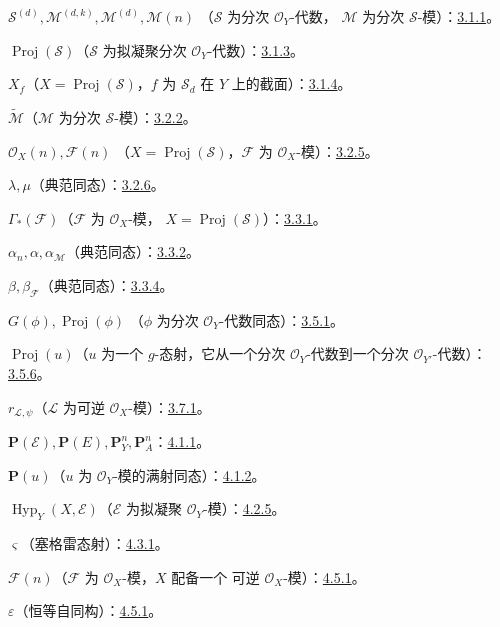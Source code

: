 \documentclass[UTF8,fontset=none,11pt,oneside,openany]{ctexbook}
\providecommand{\vphi}{\phi}
\providecommand{\Proj}{\operatorname{Proj}}
\providecommand{\Hyp}{\operatorname{Hyp}}
\newcommand{\oldpage}[2][]{%
  \hypertarget{ega-source-page-#1-#2}{}%
  \marginnote{\scriptsize\textbf{#1}~|~#2}\ignorespaces}
\begin{document}
$\mathcal{S}^{(d)},\mathcal{M}^{(d,k)},\mathcal{M}^{(d)},\mathcal{M}(n)$
（$\mathcal{S}$ 为分次 $\mathcal{O}_Y$-代数，
$\mathcal{M}$ 为分次 $\mathcal{S}$-模）：\hyperref[II.3.1.1-zh]{3.1.1}。

$\Proj(\mathcal{S})$（$\mathcal{S}$ 为拟凝聚分次 $\mathcal{O}_Y$-代数）：\hyperref[II.3.1.3-zh]{3.1.3}。

$X_f$（$X=\Proj(\mathcal{S})$，$f$ 为 $\mathcal{S}_d$ 在 $Y$ 上的截面）：\hyperref[II.3.1.4-zh]{3.1.4}。

$\widetilde{\mathcal{M}}$（$\mathcal{M}$ 为分次 $\mathcal{S}$-模）：\hyperref[II.3.2.2-zh]{3.2.2}。

$\mathcal{O}_X(n),\mathcal{F}(n)$
（$X=\Proj(\mathcal{S})$，$\mathcal{F}$ 为 $\mathcal{O}_X$-模）：\hyperref[II.3.2.5-zh]{3.2.5}。

$\lambda,\mu$（典范同态）：\hyperref[II.3.2.6-zh]{3.2.6}。

$\Gamma_*(\mathcal{F})$（$\mathcal{F}$ 为 $\mathcal{O}_X$-模，
$X=\Proj(\mathcal{S})$）：\hyperref[II.3.3.1-zh]{3.3.1}。

$\alpha_n,\alpha,\alpha_{\mathcal{M}}$（典范同态）：\hyperref[II.3.3.2-zh]{3.3.2}。

\oldpage[II]{208}
$\beta,\beta_{\mathcal{F}}$（典范同态）：\hyperref[II.3.3.4-zh]{3.3.4}。

$G(\vphi),\Proj(\vphi)$
（$\vphi$ 为分次 $\mathcal{O}_Y$-代数同态）：\hyperref[II.3.5.1-zh]{3.5.1}。

$\Proj(u)$（$u$ 为一个 $g$-态射，它从一个分次 $\mathcal{O}_Y$-代数到一个分次
$\mathcal{O}_{Y'}$-代数）：\hyperref[II.3.5.6-zh]{3.5.6}。

$r_{\mathcal{L},\psi}$（$\mathcal{L}$ 为可逆 $\mathcal{O}_X$-模）：\hyperref[II.3.7.1-zh]{3.7.1}。

$\mathbf{P}(\mathcal{E}),\mathbf{P}(E),\mathbf{P}_Y^n,\mathbf{P}_A^n$：\hyperref[II.4.1.1-zh]{4.1.1}。

$\mathbf{P}(u)$（$u$ 为 $\mathcal{O}_Y$-模的满射同态）：\hyperref[II.4.1.2-zh]{4.1.2}。

$\Hyp_Y(X,\mathcal{E})$（$\mathcal{E}$ 为拟凝聚 $\mathcal{O}_Y$-模）：\hyperref[II.4.2.5-zh]{4.2.5}。

$\varsigma$（塞格雷态射）：\hyperref[II.4.3.1-zh]{4.3.1}。

$\mathcal{F}(n)$（$\mathcal{F}$ 为 $\mathcal{O}_X$-模，$X$ 配备一个
可逆 $\mathcal{O}_X$-模）：\hyperref[II.4.5.1-zh]{4.5.1}。

$\varepsilon$（恒等自同构）：\hyperref[II.4.5.1-zh]{4.5.1}。
\end{document}
